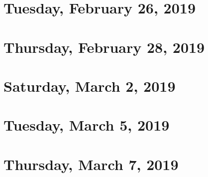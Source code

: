 \documentclass[reqno]{amsart}
\begin{document}
\section{Tuesday, February 26, 2019}
    

\section{Thursday, February 28, 2019}
    

\section{Saturday, March 2, 2019}
    

\section{Tuesday, March 5, 2019}
    

\section{Thursday, March 7, 2019}
    
\end{document}
